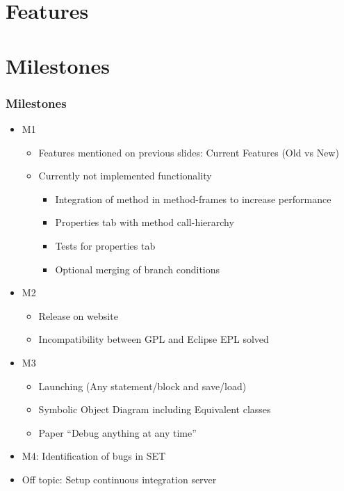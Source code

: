 \documentclass[accentcolor=tud9d,colorbacktitle,inverttitle,landscape,english,presentation,t]{tudbeamer}
\begin{document}
   \section{Features}

\section{Milestones}
   \begin{frame}[t]
		\frametitle{Milestones}
      
      \begin{itemize}
         \item M1
               \begin{itemize}
                  \item Features mentioned on previous slides: Current Features (Old vs New)
                  \item Currently not implemented functionality
                        \begin{itemize}
                           \item Integration of method in method-frames to increase performance
                           \item Properties tab with method call-hierarchy
                           \item Tests for properties tab
                           \item Optional merging of branch conditions
                        \end{itemize}
               \end{itemize}         
         \item M2
               \begin{itemize}
                  \item Release on \KeY website
                  \item Incompatibility between \KeY GPL and Eclipse EPL solved
               \end{itemize}         
         \item M3
               \begin{itemize}
                  \item Launching (Any statement/block and save/load)
                  \item Symbolic Object Diagram including Equivalent classes
                  \item Paper "`Debug anything at any time"'
               \end{itemize}
         \item M4: Identification of bugs in SET
         \item Off topic: Setup continuous integration server
      \end{itemize}
	\end{frame}
   
\end{document}
